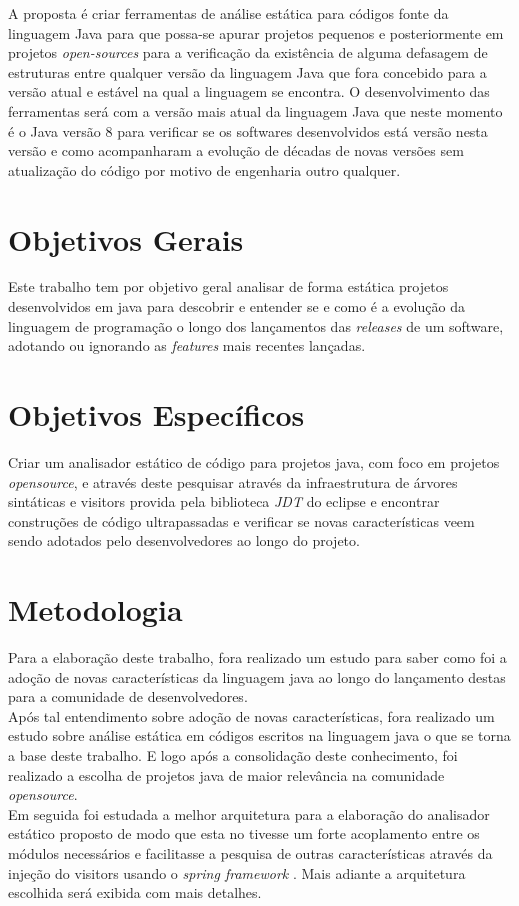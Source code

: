 A proposta é criar ferramentas de análise estática para códigos fonte da linguagem Java para que possa-se apurar projetos pequenos e posteriormente em projetos {\it open-sources} para a verificação da existência de alguma defasagem \cite{dyer2013large} de estruturas entre qualquer versão da linguagem Java que fora concebido para a versão atual e estável na qual a linguagem se encontra. O desenvolvimento das ferramentas será com a versão mais atual da linguagem Java que neste momento é o Java versão 8 para verificar se os softwares desenvolvidos está versão nesta versão e como acompanharam a evolução de décadas de novas versões sem atualização do código por motivo de engenharia outro qualquer.\\

\section{Objetivos Gerais}
	Este trabalho tem por objetivo geral analisar de forma estática projetos desenvolvidos em java  para descobrir e entender se e como é a evolução da linguagem de programação o longo dos lançamentos das \textit{releases} de um software, adotando ou ignorando as \textit{features} mais recentes lançadas.\\ 
	
\section{Objetivos Específicos}
	Criar um analisador estático de código para projetos java, com foco em projetos \textit{opensource}, e através deste pesquisar através da infraestrutura de árvores sintáticas \cite{chomsky1956three} e visitors \cite{Gamma:1995:DPE:186897} provida pela biblioteca \textit{JDT} do eclipse e encontrar construções de código ultrapassadas e verificar se novas características veem sendo adotados pelo desenvolvedores ao longo do projeto.\\
	
\section{Metodologia}
	Para a elaboração deste trabalho, fora realizado um estudo para saber como foi a adoção de novas características da linguagem java ao longo do lançamento destas para a comunidade de desenvolvedores.\\
	
	Após tal entendimento sobre adoção de novas características, fora realizado um estudo sobre análise estática em códigos escritos na linguagem java o que se torna a base deste trabalho. E logo após a consolidação deste conhecimento, foi realizado a escolha de projetos java de maior relevância na comunidade \textit{opensource}.\\
	
	Em seguida foi estudada a melhor arquitetura para a elaboração do analisador estático proposto de modo que esta no tivesse um forte acoplamento entre os módulos necessários e facilitasse a pesquisa de outras características através da injeção do visitors \cite{Gamma:1995:DPE:186897} usando o \textit{spring framework} \cite{SPRING_REF}. Mais adiante a arquitetura escolhida será exibida com mais detalhes.\\